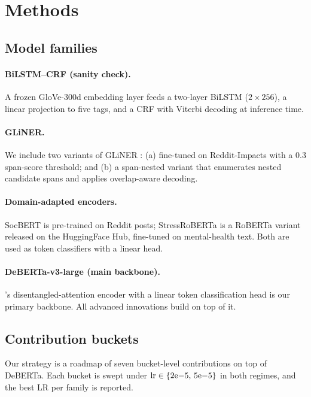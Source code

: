 \documentclass[11pt]{article}
\begin{document}
\section{Methods}
\label{sec:methods}

\subsection{Model families}
\label{sec:models}

\paragraph{BiLSTM--CRF (sanity check).} A frozen GloVe-300d embedding
layer feeds a two-layer BiLSTM ($2{\times}256$), a linear projection to
five tags, and a CRF with Viterbi decoding at inference time.

\paragraph{GLiNER.} We include two variants of GLiNER
\citep{zaratiana2024gliner}: (a) fine-tuned on Reddit-Impacts with a
$0.3$ span-score threshold; and (b) a span-nested variant that enumerates
nested candidate spans and applies overlap-aware decoding.

\paragraph{Domain-adapted encoders.} SocBERT \citep{guo2023socbert} is
pre-trained on Reddit posts; StressRoBERTa \citep{stressroberta2022} is
a RoBERTa variant released on the HuggingFace Hub, fine-tuned on
mental-health text. Both are used as token classifiers with a linear head.

\paragraph{DeBERTa-v3-large (main backbone).}
\citet{he2023debertav3}'s disentangled-attention encoder with a linear
token classification head is our primary backbone. All advanced
innovations build on top of it.

\subsection{Contribution buckets}

Our strategy is a roadmap of seven bucket-level contributions on top of
DeBERTa. Each bucket is swept under $\mathrm{lr}\in\{2{\rm e}{-5},\,
5{\rm e}{-5}\}$ in both regimes, and the best LR per family is reported.
\end{document}
